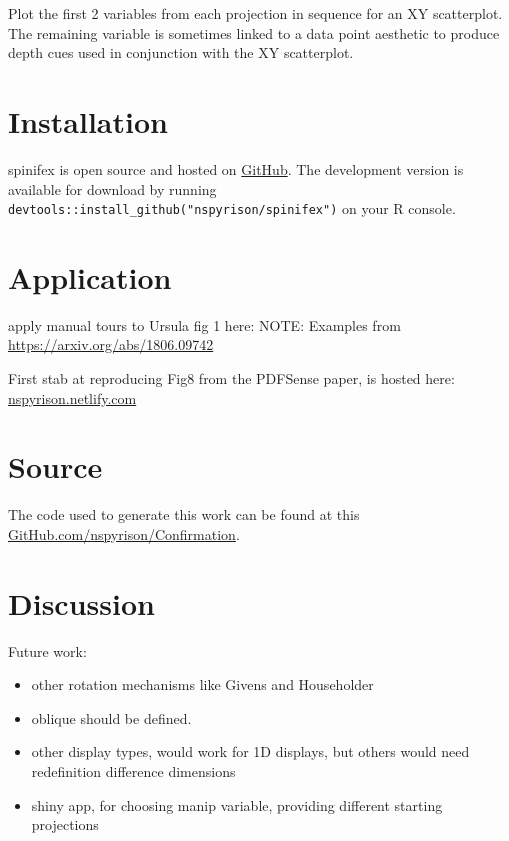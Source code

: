 \documentclass{monashthesis}
\begin{document}
Plot the first 2 variables from each projection in sequence for an XY
scatterplot. The remaining variable is sometimes linked to a data point
aesthetic to produce depth cues used in conjunction with the XY
scatterplot.

\section{Installation}\label{installation}

spinifex is open source and hosted on
\href{https://github.com/nspyrison/spinifex}{GitHub}. The development
version is available for download by running
\texttt{devtools::install\_github("nspyrison/spinifex")} on your R
console.

\section{Application}\label{application}

apply manual tours to Ursula fig 1 here: NOTE: Examples from
\url{https://arxiv.org/abs/1806.09742}

First stab at reproducing Fig8 from the PDFSense paper, is hosted here:
\href{https://nspyrison.netlify.com/else/pdfsense_fig8repex/}{nspyrison.netlify.com}

\section{Source}\label{source}

The code used to generate this work can be found at this
\href{https://github.com/nspyrison/Confirmation/}{GitHub.com/nspyrison/Confirmation}.

\section{Discussion}\label{discussion}

Future work:

\begin{itemize}
\tightlist
\item
  other rotation mechanisms like Givens and Householder
\item
  oblique should be defined.
\item
  other display types, would work for 1D displays, but others would need
  redefinition difference dimensions
\item
  shiny app, for choosing manip variable, providing different starting
  projections
\end{itemize}
\end{document}

